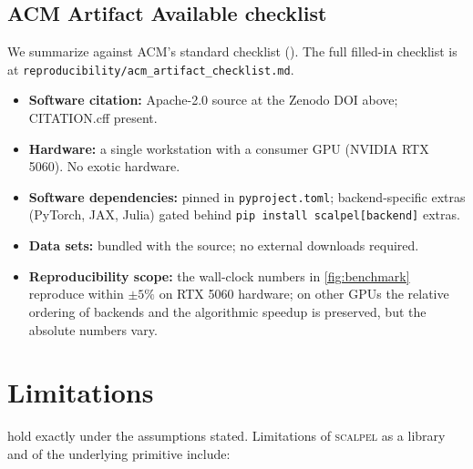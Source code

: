 \documentclass[manuscript,review]{acmart}
\newcommand{\scalpel}{\textsc{scalpel}}
\begin{document}
\subsection{ACM Artifact Available checklist}

We summarize against ACM's standard checklist
(\cite{acm-artifact-2020}). The full filled-in checklist is at
\texttt{reproducibility/acm\_artifact\_checklist.md}.

\begin{itemize}[leftmargin=*]
\item \textbf{Software citation:} Apache-2.0 source at the Zenodo DOI above; CITATION.cff present.
\item \textbf{Hardware:} a single workstation with a consumer GPU
(NVIDIA RTX 5060). No exotic hardware.
\item \textbf{Software dependencies:} pinned in \texttt{pyproject.toml};
backend-specific extras (PyTorch, JAX, Julia) gated behind
\texttt{pip install scalpel[backend]} extras.
\item \textbf{Data sets:} bundled with the source; no external
downloads required.
\item \textbf{Reproducibility scope:} the wall-clock numbers in
\cref{fig:benchmark} reproduce within $\pm 5\%$ on RTX 5060 hardware;
on other GPUs the relative ordering of backends and the algorithmic
speedup is preserved, but the absolute numbers vary.
\end{itemize}

\section{Limitations}\label{sec:limitations}

 hold exactly under the
assumptions stated. Limitations of \scalpel{} as a library and of
the underlying primitive include:
\end{document}
